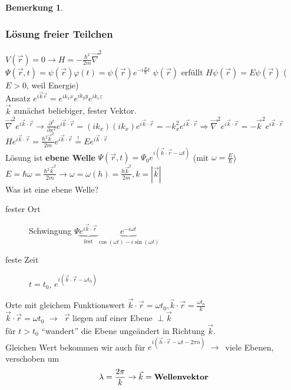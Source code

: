 \documentclass[oneside]{book}
\theoremstyle{definition}
\newtheorem*{bemerkung*}{Bemerkung}
\newcommand{\conseq}{$\rightarrow$~}
\newcommand{\ffpartial}[2]{\frac{\partial #1}{\partial #2}}
\newcommand{\vp}{\varphi}
\begin{document}
\begin{bemerkung*}
	\subsubsection{Lösung freier Teilchen}
	$V(\vec{r}) = 0 \rightarrow H = - \frac{\hbar^2}{2m} \vec{\nabla}^2$\\
	$\Psi(\vec{r}, t) = \psi(\vec{r}) \vp(t) = \psi(\vec{r}) e^{- i \frac{E}{\hbar} t}$
	$\psi(\vec{r})$ erfüllt $H\psi(\vec{r}) = E\psi(\vec{r})$ ($E > 0$, weil Energie)\\
	Ansatz $e^{i\vec{k} \vec{r}} = e^{i k_x x} e^{i k_y y} e^{i k_z z}$\\
	$\vec{k}$ zunächst beliebiger, fester Vektor.\\
	$\vec{\nabla}^2 e^{i\vec{k}\cdot \vec{r}} \rightarrow \ffpartial{^2}{x^2} e^{i\vec{k}\cdot \vec{r}} = (ik_x) (i k_x) e^{i\vec{k}\cdot \vec{r}} = -k_x^2 e^{i\vec{k}\cdot \vec{r}} \Rightarrow \vec{\nabla}^2 e^{i\vec{k}\cdot \vec{r}} = - \vec{k}^2 e^{i\vec{k}\cdot \vec{r}}$\\
	$H e^{i\vec{k}\cdot \vec{r}} = \frac{\hbar^2 \vec{k}^2}{2m} e^{i\vec{k}\cdot \vec{r}} \overset{!}{=} E e^{i\vec{k}\cdot \vec{r}}$\\
	Lösung ist \textbf{ebene Welle} $\Psi(\vec{r}, t) = \Psi_0 e^{i (\vec{k} \cdot \vec{r} - \omega t)}$ (mit $\omega = \frac{E}{\hbar}$)\\
	$E = \hbar \omega = \frac{\hbar^2 \vec{k}^2}{2m} \rightarrow \omega = \omega(h) = \frac{\hbar \vec{k}^2}{2m}, k = |\vec{k}|$\\
	Was ist eine ebene Welle?
	\begin{description}
		\item[fester Ort] Schwingung $\Psi \underbrace{e^{i\vec{k} \cdot \vec{r}}}_{\text{fest}} \underbrace{e^{-i\omega t}}_{\cos(\omega t) - i \sin(\omega t)}$
		\item[feste Zeit] $t = t_0$, $e^{i (\vec{k} \cdot \vec{r} - \omega t_0)}$
	\end{description}
	Orte mit gleichem Funktionswert $\vec{k} \cdot \vec{r} = \omega t_0, \hat{k} \cdot \vec{r} = \frac{\omega t_0}{k}$\\
	$\vec{k} \cdot \vec{r} = \omega t_0$ \conseq $\vec{r}$ liegen auf einer Ebene $\perp \vec{k}$\\
	für $t > t_0$ "`wandert"' die Ebene ungeändert in Richtung $\vec{k}$.\\
	Gleichen Wert bekommen wir auch für $e^{i(\vec{h} \cdot \vec{r} - \omega t - 2 \pi n)}$ \conseq viele Ebenen, verschoben um 
	$$\lambda = \frac{2\pi}{k} \rightarrow \vec{k} = \text{\textbf{Wellenvektor}}$$

\end{bemerkung*}
\end{document}
